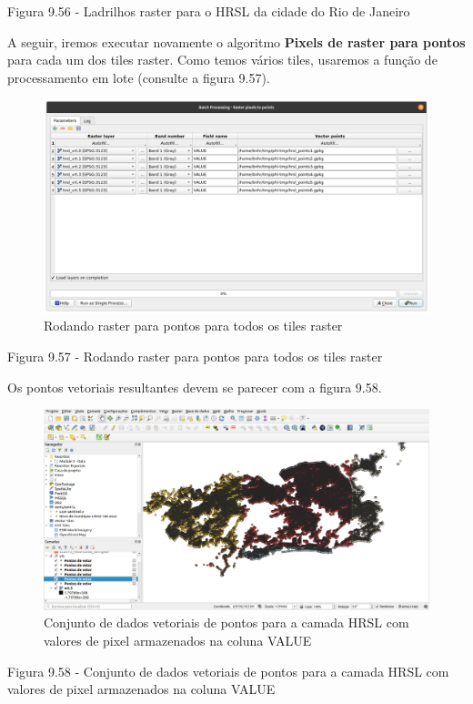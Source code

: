 \documentclass[
]{krantz}
\begin{document}
Figura 9.56 - Ladrilhos raster para o HRSL da cidade do Rio de Janeiro

A seguir, iremos executar novamente o algoritmo \textbf{Pixels de raster para pontos} para cada um dos tiles raster. Como temos vários tiles, usaremos a função de processamento em lote (consulte a figura 9.57).

\begin{figure}
\centering
\includegraphics{media/modulo9/fig957.png}
\caption{Rodando raster para pontos para todos os tiles raster}
\end{figure}

Figura 9.57 - Rodando raster para pontos para todos os tiles raster

Os pontos vetoriais resultantes devem se parecer com a figura 9.58.

\begin{figure}
\centering
\includegraphics{media/modulo9/fig958.png}
\caption{Conjunto de dados vetoriais de pontos para a camada HRSL com valores de pixel armazenados na coluna VALUE}
\end{figure}

Figura 9.58 - Conjunto de dados vetoriais de pontos para a camada HRSL com valores de pixel armazenados na coluna VALUE
\end{document}
